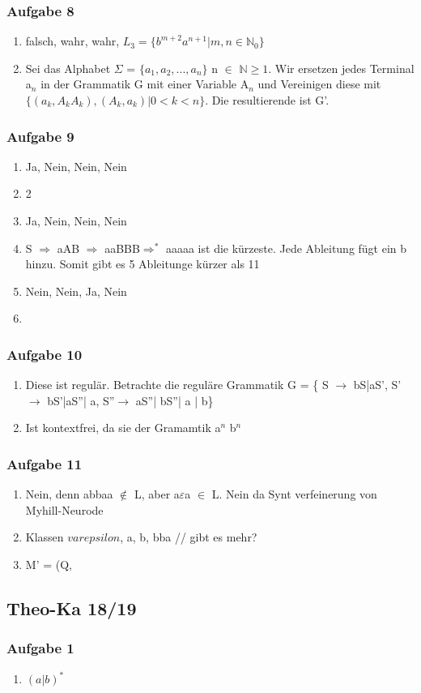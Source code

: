 \documentclass[12pt]{scrartcl}
\begin{document}
\subsubsection{Aufgabe 8}
	\begin{enumerate}
		\item falsch, wahr, wahr, \(L_3=\{ b^{m+2} a^{n+1}| m,n \in \mathbb{N}_0 \}  \)
		\item Sei das Alphabet $\Sigma$ = \(\{a_1, a_2, ..., a_n  \}\) n $\in$ $\mathbb{N}\ge 1$. Wir ersetzen jedes Terminal a$_n$ in der Grammatik G mit einer Variable A$_n$ und Vereinigen diese mit\(\{ (a_k,A_k A_k),(A_k,a_k)| 0 < k < n \}\). Die resultierende ist G'.
	\end{enumerate}
	
\subsubsection{Aufgabe 9}
	\begin{enumerate}
		\item Ja, Nein, Nein, Nein
		\item 2
		\item Ja, Nein, Nein, Nein
		\item S $\Rightarrow$ aAB $\Rightarrow$ aaBBB$\Rightarrow^{*}$ aaaaa ist die kürzeste. Jede Ableitung fügt ein b hinzu. Somit gibt es 5 Ableitunge kürzer als 11
	\item Nein, Nein, Ja, Nein
	\item
	\end{enumerate}
\subsubsection{Aufgabe 10}
	\begin{enumerate}
		\item Diese ist regulär. Betrachte die reguläre Grammatik G = \{ S $\rightarrow$ bS|aS', S' $\rightarrow$ bS'|aS''| a, S''$\rightarrow$ aS''| bS''| a | b\}
		\item Ist kontextfrei, da sie der Gramamtik a$^{n}$ b$^{n}$
	\end{enumerate}
	
\subsubsection{Aufgabe 11}
\begin{enumerate}
	\item Nein, denn abbaa $\notin$ L, aber a$\varepsilon$a $\in$ L. Nein da Synt verfeinerung von Myhill-Neurode
	\item Klassen $varepsilon$, a, b, bba // gibt es mehr?
	\item M' = (Q, 
\end{enumerate}

\subsection{Theo-Ka 18/19}
	\subsubsection{Aufgabe 1}
	\begin{enumerate}
		\item \( (a|b)^{*}  \)
	\end{enumerate}
\end{document}

